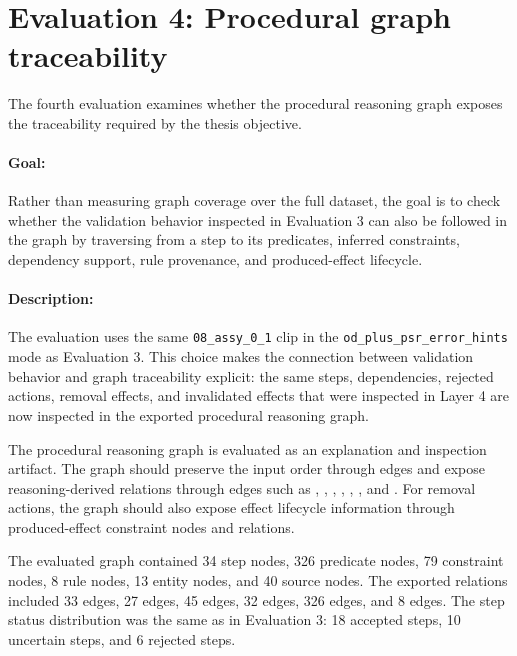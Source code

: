 \section{Evaluation 4: Procedural graph traceability}
\label{sec:evaluation-graph-traceability}

The fourth evaluation examines whether the procedural reasoning graph exposes the
traceability required by the thesis objective.

\paragraph{Goal:}
Rather than measuring graph coverage over the full dataset, the goal is to check
whether the validation behavior inspected in Evaluation 3 can also be followed in
the graph by traversing from a step to its predicates, inferred constraints,
dependency support, rule provenance, and produced-effect lifecycle.

\paragraph{Description:}
The evaluation uses the same \texttt{08\_assy\_0\_1} clip in the
\texttt{od\_plus\_psr\_error\_hints} mode as Evaluation 3. This choice makes the
connection between validation behavior and graph traceability explicit: the same
steps, dependencies, rejected actions, removal effects, and invalidated effects
that were inspected in Layer 4 are now inspected in the exported procedural
reasoning graph.

The procedural reasoning graph is evaluated as an explanation and inspection
artifact. The graph should preserve the input order through  edges
and expose reasoning-derived relations through edges such as ,
, , ,
, , and .
For removal actions, the graph should also expose effect lifecycle information
through produced-effect constraint nodes and  relations.

The evaluated graph contained 34 step nodes, 326 predicate nodes, 79 constraint
nodes, 8 rule nodes, 13 entity nodes, and 40 source nodes. The exported relations
included 33  edges, 27  edges, 45
 edges, 32  edges, 326 
edges, and 8  edges. The step status distribution was the
same as in Evaluation 3: 18 accepted steps, 10 uncertain steps, and 6 rejected
steps.

